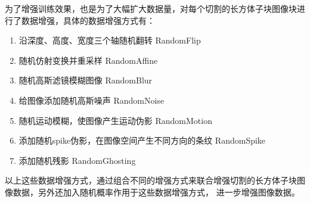 为了增强训练效果，也是为了大幅扩大数据量，对每个切割的长方体子块图像块进行了数据增强，具体的数据增强方式有：
\begin{enumerate}\label{enum:data_augmentation}
    \item {沿深度、高度、宽度三个轴随机翻转 RandomFlip}
    \item {随机仿射变换并重采样 RandomAffine}
    \item {随机高斯滤镜模糊图像 RandomBlur}
    \item {给图像添加随机高斯噪声 RandomNoise}
    \item {随机运动模糊，使图像产生运动伪影 RandomMotion}
    \item {添加随机spike伪影，在图像空间产生不同方向的条纹 RandomSpike}
    \item {添加随机残影 RandomGhosting}
\end{enumerate}
以上这些数据增强方式，通过组合不同的增强方式来联合增强切割的长方体子块图像数据，另外还加入随机概率作用于这些数据增强方式，
进一步增强图像数据。



